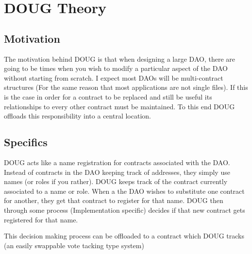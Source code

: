 \documentclass[]{article}
\begin{document}
\section{DOUG Theory}
\label{sec:QFT:minkowski}

\subsection{Motivation}
\label{sec:Minkowski:motivation}

The motivation behind DOUG is that when designing a large DAO, there are going to be times when you wish to modify a particular aspect of the DAO without starting from scratch. I expect most DAOs will be multi-contract structures (For the same reason that most applications are not single files). If this is the case in order for a contract to be replaced and still be useful its relationships to every other contract must be maintained. To this end DOUG offloads this responsibility into a central location. 

\subsection{Specifics}
\label{sec:Minkowski:theory}

DOUG acts like a name registration for contracts associated with the DAO. Instead of contracts in the DAO keeping track of addresses, they simply use names (or roles if you rather). DOUG keeps track of the contract currently associated to a name or role. When a the DAO wishes to substitute one contract for another, they get that contract to register for that name. DOUG then through some process (Implementation specific) decides if that new contract gets registered for that name.

This decision making process can be offloaded to a contract which DOUG tracks (an easily swappable vote tacking type system)
\end{document}

